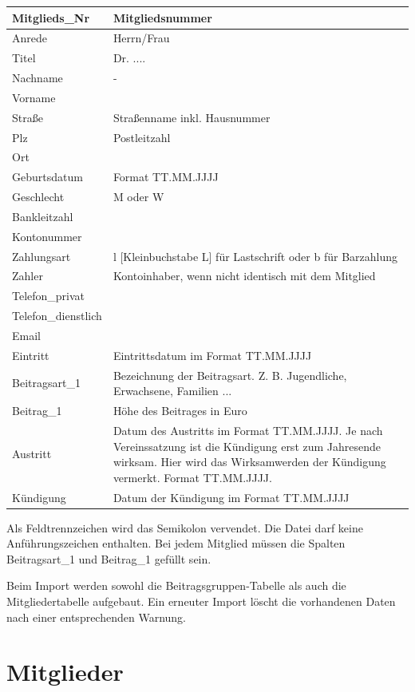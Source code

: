 \documentclass[a4paper,BCOR30mm,DIV14,pdftex,liststotoc,footsepline,openany]{scrbook}
\begin{document}
\begin{longtable}{|p{80pt}|p{300pt}|}
\hline
Mitglieds\_Nr&Mitgliedsnummer\\ 
\hline
Anrede & Herrn/Frau \\ 
\hline
Titel & Dr. .... \\ 
\hline
Nachname & - \\ 
\hline
Vorname&\\
\hline
Straße&Straßenname inkl. Hausnummer\\
\hline
Plz&Postleitzahl\\
\hline
Ort&\\
\hline
Geburtsdatum&Format TT.MM.JJJJ\\
\hline
Geschlecht&M oder W\\
\hline
Bankleitzahl&\\ 
\hline
Kontonummer&\\
\hline
Zahlungsart&l [Kleinbuchstabe L] für Lastschrift oder b für Barzahlung\\
\hline
Zahler&Kontoinhaber, wenn nicht identisch mit dem Mitglied\\
\hline
Telefon\_privat&\\
\hline
Telefon\_dienstlich&\\ 
\hline
Email&\\
\hline
Eintritt&Eintrittsdatum im Format TT.MM.JJJJ\\
\hline
Beitragsart\_1&Bezeichnung der Beitragsart. Z. B. Jugendliche, Erwachsene, Familien ...\\
\hline
Beitrag\_1&Höhe des Beitrages in Euro\\
\hline
Austritt&Datum des Austritts im Format TT.MM.JJJJ. Je nach Vereinssatzung ist die Kündigung erst zum Jahresende wirksam. 
Hier wird das Wirksamwerden der Kündigung vermerkt. Format TT.MM.JJJJ.\\
\hline
Kündigung&Datum der Kündigung im Format TT.MM.JJJJ\\
\hline
\end{longtable}

Als Feldtrennzeichen wird das Semikolon vervendet.
Die Datei darf keine Anführungszeichen enthalten. Bei jedem Mitglied müssen die Spalten Beitragsart\_1 und Beitrag\_1 gefüllt sein.

Beim Import werden sowohl die Beitragsgruppen-Tabelle als auch die Mitgliedertabelle aufgebaut. Ein erneuter Import löscht die vorhandenen Daten nach einer entsprechenden Warnung.



\chapter{Mitglieder}
\end{document}

